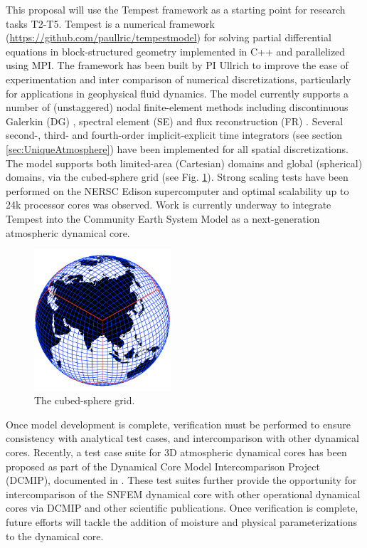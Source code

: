 \documentclass[11pt]{article}
\begin{document}
This proposal will use the Tempest framework \cite{ullrich2014global} as a starting point for research tasks T2-T5.  Tempest is a numerical framework (\url{https://github.com/paullric/tempestmodel}) \cite{ullrich2014global} for solving partial differential equations in block-structured geometry implemented in C++ and parallelized using MPI.  The framework has been built by PI Ullrich to improve the ease of experimentation and inter comparison of numerical discretizations, particularly for applications in geophysical fluid dynamics.  The model currently supports a number of (unstaggered) nodal finite-element methods including discontinuous Galerkin (DG) \cite{cockburn2000development}, spectral element (SE) \cite{maday1989spectral} and flux reconstruction (FR) \cite{huynh2007flux}.  Several second-, third- and fourth-order implicit-explicit time integrators (see section \ref{sec:UniqueAtmosphere}) have been implemented for all spatial discretizations.  The model supports both limited-area (Cartesian) domains and global (spherical) domains, via the cubed-sphere grid (see Fig. \ref{fig:CubedSphere}).  Strong scaling tests have been performed on the NERSC Edison supercomputer and optimal scalability up to 24k processor cores was observed.  Work is currently underway to integrate Tempest into the Community Earth System Model \cite{JWHetal2013BAMS} as a next-generation atmospheric dynamical core.

\begin{figure}
\begin{center}
\includegraphics[width=2in]{A_CubedSphere}
\end{center}
\caption{The cubed-sphere grid.} \label{fig:CubedSphere}
\end{figure}

Once model development is complete, verification must be performed to ensure consistency with analytical test cases, and intercomparison with other dynamical cores.  Recently, a test case suite for 3D atmospheric dynamical cores has been proposed as part of the Dynamical Core Model Intercomparison Project (DCMIP), documented in \cite{DCMIP2012TESTCASES, kent2013dynamical}.  These test suites further provide the opportunity for intercomparison of the SNFEM dynamical core with other operational dynamical cores via DCMIP and other scientific publications.  Once verification is complete, future efforts will tackle the addition of moisture and physical parameterizations to the dynamical core.
\end{document}
